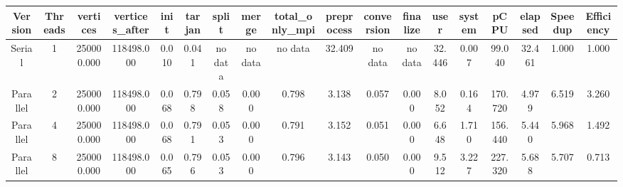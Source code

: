\begin{tabular}{|c|c|c|c|c|c|c|c|c|c|c|c|c|c|c|c|c|c|}
\toprule
 Version &  Threads &   vertices &  vertices\_after &  init &  tarjan &   split &   merge & total\_only\_mpi &  preprocess & conversion & finalize &   user &  system &    pCPU &  elapsed &  Speedup &  Efficiency \\
\midrule
  Serial &        1 & 250000.000 &      118498.000 & 0.010 &   0.041 & no data & no data &        no data &      32.409 &    no data &  no data & 32.446 &   0.007 &  99.040 &   32.461 &    1.000 &       1.000 \\
Parallel &        2 & 250000.000 &      118498.000 & 0.068 &   0.798 &   0.058 &   0.000 &          0.798 &       3.138 &      0.057 &    0.000 &  8.052 &   0.164 & 170.720 &    4.979 &    6.519 &       3.260 \\
Parallel &        4 & 250000.000 &      118498.000 & 0.068 &   0.791 &   0.053 &   0.000 &          0.791 &       3.152 &      0.051 &    0.000 &  6.648 &   1.710 & 156.440 &    5.440 &    5.968 &       1.492 \\
Parallel &        8 & 250000.000 &      118498.000 & 0.065 &   0.796 &   0.053 &   0.000 &          0.796 &       3.143 &      0.050 &    0.000 &  9.512 &   3.227 & 227.320 &    5.688 &    5.707 &       0.713 \\
\bottomrule
\end{tabular}
